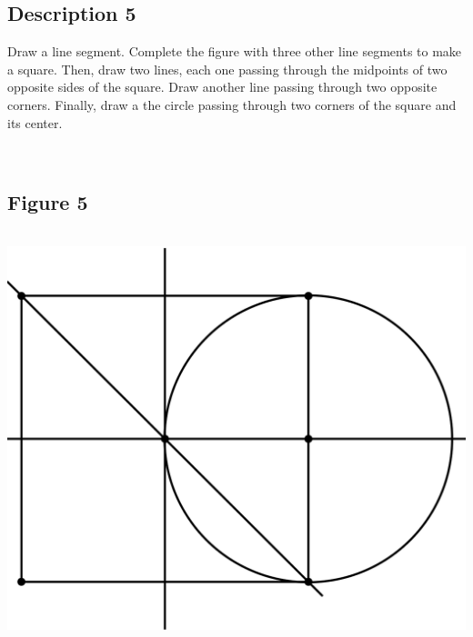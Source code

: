 \documentclass[12pt,a4paper,article,english,firamath]{nsi}
\begin{document}
\maketitle

\subsection*{Description 5}
{\brettley 

Draw a line segment. Complete the figure with three other line segments to make a square. Then, draw two lines, each one
passing through the midpoints of two opposite sides of the square. Draw another line passing through two opposite
corners. Finally, draw a the circle passing through two corners of the square and its center.}\\[1em]



\subsection*{Figure 5}
\begin{center}
    \includegraphics[height=12cm]{img/fig05.png}
\end{center}
\end{document}
